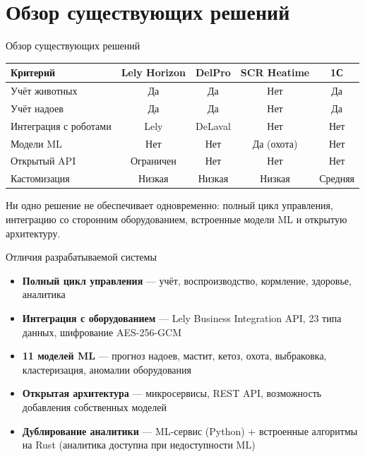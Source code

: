 \documentclass[aspectratio=169, 12pt]{beamer}
\begin{document}
\section{Обзор существующих решений}

\begin{frame}{Обзор существующих решений}
  \begin{center}
    \small
    \begin{tabular}{|l|c|c|c|c|}
      \hline
      \textbf{Критерий} & \textbf{Lely Horizon} & \textbf{DelPro} & \textbf{SCR Heatime} & \textbf{1С} \\
      \hline
      Учёт животных & Да & Да & Нет & Да \\
      \hline
      Учёт надоев & Да & Да & Нет & Да \\
      \hline
      Интеграция с роботами & Lely & DeLaval & Нет & Нет \\
      \hline
      Модели ML & Нет & Нет & Да (охота) & Нет \\
      \hline
      Открытый API & Ограничен & Нет & Нет & Нет \\
      \hline
      Кастомизация & Низкая & Низкая & Низкая & Средняя \\
      \hline
    \end{tabular}
  \end{center}
  \vspace{0.5em}
  Ни одно решение не обеспечивает одновременно: полный цикл управления, интеграцию со сторонним оборудованием, встроенные модели ML и открытую архитектуру.
\end{frame}

\begin{frame}{Отличия разрабатываемой системы}
  \begin{itemize}
    \item \textbf{Полный цикл управления} --- учёт, воспроизводство, кормление, здоровье, аналитика
    \item \textbf{Интеграция с оборудованием} --- Lely Business Integration API, 23 типа данных, шифрование AES-256-GCM
    \item \textbf{11 моделей ML} --- прогноз надоев, мастит, кетоз, охота, выбраковка, кластеризация, аномалии оборудования
    \item \textbf{Открытая архитектура} --- микросервисы, REST API, возможность добавления собственных моделей
    \item \textbf{Дублирование аналитики} --- ML-сервис (Python) + встроенные алгоритмы на Rust (аналитика доступна при недоступности ML)
  \end{itemize}
\end{frame}
\end{document}
